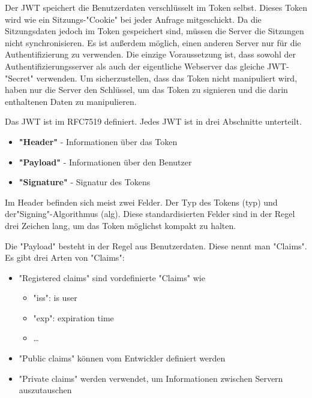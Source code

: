 \label{sec:jwt}

Der JWT speichert die Benutzerdaten verschlüsselt im Token selbst. Dieses Token wird wie ein Sitzungs-"Cookie" bei jeder Anfrage mitgeschickt. 
Da die Sitzungsdaten jedoch im Token gespeichert sind, müssen die Server die Sitzungen nicht synchronisieren. 
Es ist außerdem möglich, einen anderen Server nur für die Authentifizierung zu verwenden. 
Die einzige Voraussetzung ist, dass sowohl der Authentifizierungsserver als auch der eigentliche Webserver das gleiche JWT-"Secret" verwenden. 
Um sicherzustellen, dass das Token nicht manipuliert wird, haben nur die Server den Schlüssel, um das Token zu signieren und die darin enthaltenen Daten zu manipulieren. \cite{Auth0JWT}

Das JWT ist im RFC7519 definiert. Jedes JWT ist in drei Abschnitte\cite{Auth0JWT} unterteilt. 

\begin{itemize}
    \item \textbf{"Header"} - Informationen über das Token
    \item \textbf{"Payload"} - Informationen über den Benutzer
    \item \textbf{"Signature"} - Signatur des Tokens
\end{itemize}

Im Header befinden sich meist zwei Felder. 
Der Typ des Tokens ({\ttfamily typ}) und der\linebreak"Signing"-Algorithmus ({\ttfamily alg}). 
Diese standardisierten Felder sind in der Regel drei Zeichen lang, um das Token möglichst kompakt zu halten. \cite{Auth0JWT}

Die "Payload" besteht in der Regel aus Benutzerdaten. Diese nennt man "Claims". Es gibt drei Arten von "Claims"\cite{Auth0JWT}: 

\begin{itemize}
    \item "Registered claims" sind vordefinierte "Claims" wie
    \begin{itemize}
        \item "iss": is user
        \item "exp":  expiration time
        \item …
    \end{itemize}
    \item "Public claims" können vom Entwickler definiert werden
    \item "Private claims" werden verwendet, um Informationen zwischen Servern auszutauschen
\end{itemize}


